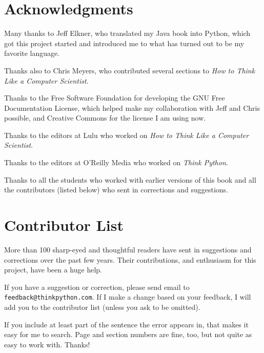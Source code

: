 \section*{Acknowledgments}

Many thanks to Jeff Elkner, who
translated my Java book into Python, which got this project
started and introduced me to what has turned out to be my
favorite language.

Thanks also to Chris Meyers, who contributed several sections
to {\em How to Think Like a Computer Scientist}.

Thanks to the Free Software Foundation for developing
the GNU Free Documentation License, which helped make
my collaboration with Jeff and Chris possible, and Creative
Commons for the license I am using now.

Thanks to the editors at Lulu who worked on
{\em How to Think Like a Computer Scientist}.

Thanks to the editors at O'Reilly Media who worked on
{\em Think Python}.

Thanks to all the students who worked with earlier
versions of this book and all the contributors (listed
below) who sent in corrections and suggestions.


\section*{Contributor List}

More than 100 sharp-eyed and thoughtful readers have sent in
suggestions and corrections over the past few years.  Their
contributions, and enthusiasm for this project, have been a
huge help.

If you have a suggestion or correction, please send email to
{\tt feedback@thinkpython.com}.  If I make a change based on your
feedback, I will add you to the contributor list
(unless you ask to be omitted).

If you include at least part of the sentence the
error appears in, that makes it easy for me to search.  Page and
section numbers are fine, too, but not quite as easy to work with.
Thanks!

